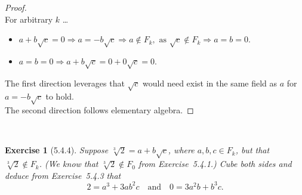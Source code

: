 \documentclass[12pt]{article}
\newcommand{\XB}{\color{black}}
\newcommand{\XBB}{\color{blue}}
\newcommand{\ds}{\displaystyle}
\theoremstyle{plain}
\newtheorem{ex}{Exercise}
\begin{document}
\begin{proof}
  \ \\

  For arbitrary $ k $ \dots

  \begin{itemize}
    \item $ \ds a + b\sqrt{c} = 0 \Rightarrow a = -b\sqrt{c} \Rightarrow a \notin F_{k}, \text{ as } \sqrt{c} \notin F_{k} \Rightarrow a = b = 0 $.
    \item $ \ds a = b = 0 \Rightarrow a + b\sqrt{c} = 0 + 0\sqrt{c} = 0 $.
  \end{itemize}

  The first direction leverages that $ \sqrt{c} $ would need exist in the same field as $ a $ for $ a = -b\sqrt{c} $ to hold. \\
  The second direction follows elementary algebra.

\end{proof}

\newpage


\XBB\hrulefill\XB \\
\begin{ex} [5.4.4]
  Suppose $ \sqrt[3]{2} = a + b\sqrt{c} $, where $ a, b, c \in F_{k} $, but that $ \sqrt[3]{2} \notin F_{k} $. (We know that $ \sqrt[3]{2} \notin F_{0} $ from Exercise~5.4.1.) Cube both sides and deduce from Exercise~5.4.3 that
  \[
    2 = a^{3} + 3ab^{2}c \quad \text{and} \quad 0 = 3a^{2}b + b^{3}c.
  \]
\end{ex}
\XBB\hrulefill\XB \\
\end{document}
